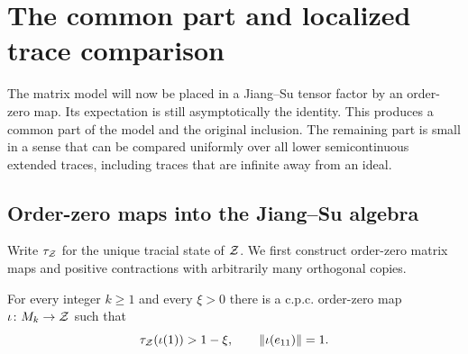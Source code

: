 \section{The common part and localized trace comparison}
\label{sec:traces}

The matrix model will now be placed in a Jiang--Su tensor factor by an
order-zero map.  Its expectation is still asymptotically the identity.
This produces a common part of the model and the original inclusion.
The remaining part is small in a sense that can be compared uniformly
over all lower semicontinuous extended traces, including traces that are
infinite away from an ideal.

\subsection{Order-zero maps into the Jiang--Su algebra}

Write $\tau_{\mathcal Z}$ for the unique tracial state of $\mathcal Z$.
We first construct order-zero matrix maps and positive contractions
with arbitrarily many orthogonal copies.

\begin{lemma}\label{supplies:order-zero}
For every integer $k\geq 1$ and every $\xi>0$ there is a c.p.c.
order-zero map $\iota\colon M_k\to\mathcal Z$ such that
\[
 \tau_{\mathcal Z}(\iota(1))>1-\xi,
 \qquad \|\iota(e_{11})\|=1.
\]
\end{lemma}

